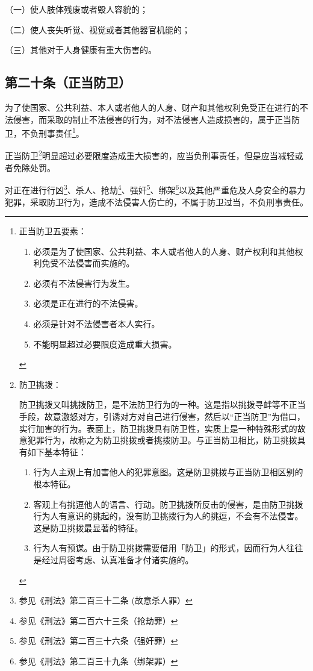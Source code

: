 \documentclass[utf-8,10pt]{ctexart}
\begin{document}
（一）使人肢体残废或者毁人容貌的；

（二）使人丧失听觉、视觉或者其他器官机能的；

（三）其他对于人身健康有重大伤害的。
\subsection{第二十条（正当防卫）}
为了使国家、公共利益、本人或者他人的人身、财产和其他权利免受正在进行的不法侵害，而采取的制止不法侵害的行为，对不法侵害人造成损害的，属于正当防卫，不负刑事责任\footnote{
正当防卫五要素：
\begin{enumerate}
\item 必须是为了使国家、公共利益、本人或者他人的人身、财产权利和其他权利免受不法侵害而实施的。
\item 必须有不法侵害行为发生。
\item 必须是正在进行的不法侵害。
\item 必须是针对不法侵害者本人实行。
\item 不能明显超过必要限度造成重大损害。
\end{enumerate}
}。

正当防卫\footnote{防卫挑拨：


防卫挑拨又叫挑拨防卫，是不法防卫行为的一种。这是指以挑拨寻衅等不正当手段，故意激怒对方，引诱对方对自己进行侵害，然后以“正当防卫”为借口，实行加害的行为。表面上，防卫挑拨具有防卫性，实质上是一种特殊形式的故意犯罪行为，故称之为防卫挑拨或者挑拨防卫。与正当防卫相比，防卫挑拨具有如下基本特征：
\begin{enumerate}
\item 行为人主观上有加害他人的犯罪意图。这是防卫挑拨与正当防卫相区别的根本特征。
\item 客观上有挑逗他人的语言、行动。防卫挑拨所反击的侵害，是由防卫挑拨行为人有意识的挑起的，没有防卫挑拨行为人的挑逗，不会有不法侵害。这是防卫挑拨最显著的特征。
\item 行为人有预谋。由于防卫挑拨需要借用「防卫」的形式，因而行为人往往是经过周密考虑、认真准备才付诸实施的。
\end{enumerate}

}明显超过必要限度造成重大损害的，应当负刑事责任，但是应当减轻或者免除处罚。

对正在进行行凶\footnote{参见《刑法》第二百三十二条 (故意杀人罪）}、杀人、抢劫\footnote{参见《刑法》第二百六十三条（抢劫罪）}、强奸\footnote{参见《刑法》第二百三十六条（强奸罪）}、绑架\footnote{参见《刑法》第二百三十九条（绑架罪）}以及其他严重危及人身安全的暴力犯罪，采取防卫行为，造成不法侵害人伤亡的，不属于防卫过当，不负刑事责任。
\end{document}
